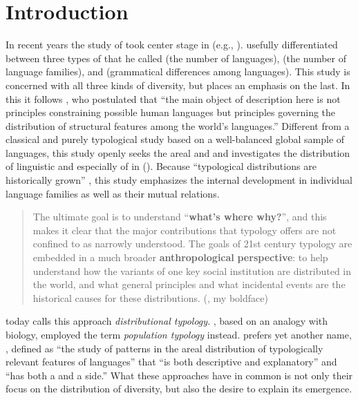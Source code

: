 \chapter{Introduction}

In recent years the study of  took center stage in  (e.g., \citealt{EvansLevinson2009}). \citet[10]{Nettle1999} usefully differentiated between three types of  that he called \textit{} (the number of languages), \textit{} (the number of language families), and \textit{} (grammatical differences among languages). This study is concerned with all three kinds of diversity, but places an emphasis on the last. In this it follows \citet[2]{Nichols1992}, who postulated that “the main object of description here is not principles constraining possible human languages but principles governing the distribution of structural features among the world’s languages.” Different from a classical and purely  typological study based on a well-balanced global sample of languages, this study openly seeks the areal and  and investigates the distribution of linguistic and especially of  in  (). Because “typological distributions are historically grown” \citep[239]{Bickel2007}, this study emphasizes the internal development in individual language families as well as their mutual relations.

\begin{quote}
The ultimate goal is to understand “\textbf{what’s where why?}”, and this makes it clear that the major contributions that typology offers are not confined to  as narrowly understood. The goals of 21st century typology are embedded in a much broader \textbf{anthropological} \textbf{perspective}: to help understand how the variants of one key social institution are distributed in the world, and what general principles and what incidental events are the historical causes for these distributions. (\citealt[248]{Bickel2007}, my boldface)
\end{quote}

\noindent \citet{Bickel2015} today calls this approach \textit{distributional typology}. \citet{Nichols1992}, based on an analogy with biology, employed the term \textit{population typology} instead. \cite[1456]{Dahl2001} prefers yet another name, \textit{}, defined as “the study of patterns in the areal distribution of typologically relevant features of languages” that “is both descriptive and explanatory” and “has both a  and a  side.” What these approaches have in common is not only their focus on the distribution of diversity, but also the desire to explain its emergence.

